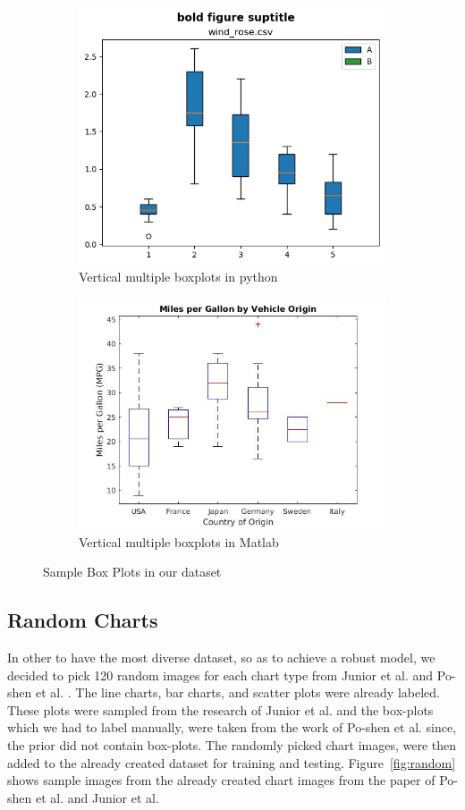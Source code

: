 \documentclass[12pt, a4paper,oneside]{report}
\begin{document}
\begin{figure}[!htbp]
	\begin{subfigure}{.5\textwidth}
		\centering
		\includegraphics[width=.8\linewidth]{box1}
		\caption{Vertical multiple boxplots in python}
		\label{fig:box1}
	\end{subfigure}%
	\begin{subfigure}{.5\textwidth}
		\centering
		\includegraphics[width=.8\linewidth]{box2}
		\caption{Vertical multiple boxplots in Matlab}
		\label{fig:box2}
	\end{subfigure}
	\caption{Sample Box Plots in our dataset}
	\label{fig:figbox}
\end{figure}


\subsection{Random Charts}
In other to have the most diverse dataset, so as to achieve a robust model, we decided to pick 120 random images for each chart type  from Junior et al. \cite{junior2017archi} and Po-shen et al. \cite{lee2016viziometrix}. The line charts, bar charts, and scatter plots were already labeled. These plots were sampled from the research of Junior et al. and the box-plots which we had to label manually, were taken from the work of Po-shen et al. since, the prior did not contain box-plots. The randomly picked chart images, were then added to the already created dataset for training and testing. Figure~\ref{fig:random} shows sample images from the already created chart images from the paper of Po-shen et al. and Junior et al.
\end{document}
